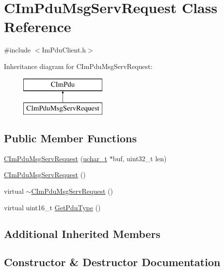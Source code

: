 \hypertarget{class_c_im_pdu_msg_serv_request}{}\section{C\+Im\+Pdu\+Msg\+Serv\+Request Class Reference}
\label{class_c_im_pdu_msg_serv_request}


{\ttfamily \#include $<$Im\+Pdu\+Client.\+h$>$}

Inheritance diagram for C\+Im\+Pdu\+Msg\+Serv\+Request\+:\begin{figure}[H]
\begin{center}
\leavevmode
\includegraphics[height=2.000000cm]{class_c_im_pdu_msg_serv_request}
\end{center}
\end{figure}
\subsection*{Public Member Functions}
\begin{DoxyCompactItemize}
\item 
\hyperlink{class_c_im_pdu_msg_serv_request_a2d7d8b3d9f74b2d2f54f11ee9b3f0446}{C\+Im\+Pdu\+Msg\+Serv\+Request} (\hyperlink{base_2ostype_8h_a124ea0f8f4a23a0a286b5582137f0b8d}{uchar\+\_\+t} $\ast$buf, uint32\+\_\+t len)
\item 
\hyperlink{class_c_im_pdu_msg_serv_request_ab0f92f637da44ac855fbe53a9eddf2f7}{C\+Im\+Pdu\+Msg\+Serv\+Request} ()
\item 
virtual \hyperlink{class_c_im_pdu_msg_serv_request_a707f1828fff4599937b34d6a6fdb7a3f}{$\sim$\+C\+Im\+Pdu\+Msg\+Serv\+Request} ()
\item 
virtual uint16\+\_\+t \hyperlink{class_c_im_pdu_msg_serv_request_a5545931b071a8fc7a5b5435a0be71af6}{Get\+Pdu\+Type} ()
\end{DoxyCompactItemize}
\subsection*{Additional Inherited Members}


\subsection{Constructor \& Destructor Documentation}
\hypertarget{class_c_im_pdu_msg_serv_request_a2d7d8b3d9f74b2d2f54f11ee9b3f0446}{}
